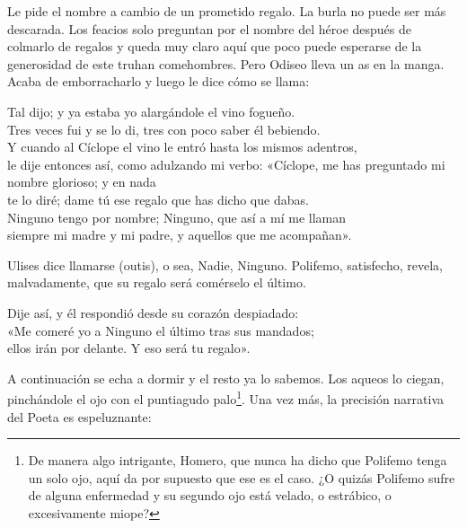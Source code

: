Le pide el nombre a cambio de un prometido regalo. La burla no puede ser más descarada. Los feacios solo preguntan por el nombre del héroe después de colmarlo de regalos y queda muy claro aquí que poco puede esperarse de la generosidad de este truhan comehombres. Pero Odiseo lleva un as en la manga. Acaba de emborracharlo y luego le dice cómo se llama:

\begin{versocita}
Tal dijo; y ya estaba yo alargándole el vino fogueño.\\
Tres veces fui y se lo di, tres con poco saber él bebiendo.\\
Y cuando al Cíclope el vino le entró hasta los mismos adentros,\\
le dije entonces así, como adulzando mi verbo:
\stanzabreak
«Cíclope, me has preguntado mi nombre glorioso; y en nada\\
te lo diré; dame tú ese regalo que has dicho que dabas.\\
Ninguno tengo por nombre; Ninguno, que así a mí me llaman\\
siempre mi madre y mi padre, y aquellos que me acompañan».
\end{versocita}

Ulises dice llamarse  (outis), o sea, Nadie, Ninguno. Polifemo, satisfecho, revela, malvadamente, que su regalo será comérselo el último.

\begin{versocita}
Dije así, y él respondió desde su corazón despiadado:\\
«Me comeré yo a Ninguno el último tras sus mandados;\\
ellos irán por delante. Y eso será tu regalo».
\end{versocita}

A continuación se echa a dormir y el resto ya lo sabemos. Los aqueos lo ciegan, pinchándole el ojo con el puntiagudo palo\footnote{De manera algo intrigante, Homero, que nunca ha dicho que Polifemo tenga un solo ojo, aquí da por supuesto que ese es el caso. ¿O quizás Polifemo sufre de alguna enfermedad y su segundo ojo está velado, o estrábico, o excesivamente miope?}. Una vez más, la precisión narrativa del Poeta es espeluznante:

